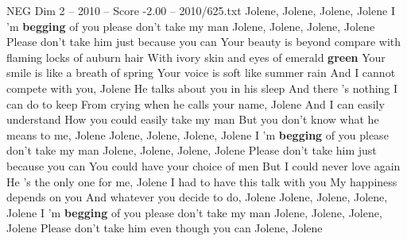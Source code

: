 \begin{textsample}{NEG Dim 2 – 2010 – Score -2.00 – 2010/625.txt}  \label{ex:f2_neg_011}
Jolene, Jolene, Jolene, Jolene I 'm \textbf{begging} of you please don't take my man Jolene, Jolene, Jolene, Jolene Please don't take him just because you can Your beauty is beyond compare with flaming locks of auburn hair With ivory skin and eyes of emerald \textbf{green} Your smile is like a breath of spring Your voice is soft like summer rain And I cannot compete with you, Jolene He talks about you in his sleep And there 's nothing I can do to keep From crying when he calls your name, Jolene And I can easily understand How you could easily take my man But you don't know what he means to me, Jolene Jolene, Jolene, Jolene, Jolene I 'm \textbf{begging} of you please don't take my man Jolene, Jolene, Jolene, Jolene Please don't take him just because you can You could have your choice of men But I could never love again He 's the only one for me, Jolene I had to have this talk with you My happiness depends on you And whatever you decide to do, Jolene Jolene, Jolene, Jolene, Jolene I 'm \textbf{begging} of you please don't take my man Jolene, Jolene, Jolene, Jolene Please don't take him even though you can Jolene, Jolene

\end{textsample}
